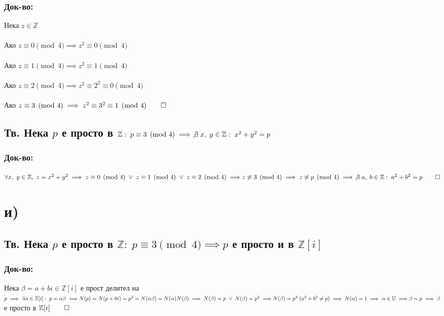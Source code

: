 \documentclass[12pt]{article}
\newcommand{\Z}{\mathbb{Z}}
\newcommand{\Rev}{\mathbb{U}}
\begin{document}
    \subsubsection*{Док-во:}
    Нека \(z \in \Z\) \\\\
    Ако \(z \equiv 0 \pmod 4 \implies z^2 \equiv 0 \pmod 4\) \\\\
    Ако \(z \equiv 1 \pmod 4 \implies z^2 \equiv 1 \pmod 4\) \\\\
    Ако \(z \equiv 2 \pmod 4 \implies z^2 \equiv 2^2 \equiv 0 \pmod 4\) \\\\
    Ако \(z \equiv 3 \pmod 4 \implies z^2 \equiv 3^2 \equiv 1 \pmod 4 \qed \)
    \subsection*{Тв. Нека \(p\) е просто в \(\Z: \; p \equiv 3 \pmod 4 \implies \not\exists \; x, \; y \in \Z: \; x^2 + y^2 = p\) } 
    \subsubsection*{Док-во:}
    \(\forall x, \; y \in \Z, \; z = x^2 + y^2 \implies z \equiv 0 \pmod 4 \; \vee \; z \equiv 1 \pmod 4 \; \vee \; z \equiv 2 \pmod 4 \implies \\\\
    z \not\equiv 3 \pmod 4 \implies z \not\equiv p \pmod 4 \implies \not\exists \; a, \; b \in \Z: \; a^2 + b^2 = p \qed \)
    \section*{и)}
    \subsection*{Тв. Нека \(p\) е просто в \(\Z: \; p \equiv 3 \pmod 4 \implies p\) е просто и в \(\Z[i]\) } 
    \subsubsection*{Док-во:}
    Нека \(\beta = a + bi \in \Z[i]\) е прост делител на \(p \implies \exists \alpha \in \Z[i]: \; p = \alpha\beta \implies \\\\
    N(p) = N(p + 0i) = p^2 = N(\alpha\beta) = N(\alpha)N(\beta) \implies N(\beta) = p \; \vee \; N(\beta) = p^2 \implies \\\\
    N(\beta) = p^2 \; (a^2 + b^2 \neq p) \implies N(\alpha) = 1 \implies \alpha \in \Rev \implies \\\\
    \beta \sim p \implies \beta \) е просто в \(\Z[i] \qed \)
\end{document}
